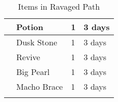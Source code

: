 \begin{longtable}{|| l l l l ||}%
\hline%
&Potion&1&3 days\\%
\hline%
&Dusk Stone&1&3 days\\%
\hline%
&Revive&1&3 days\\%
\hline%
&Big Pearl&1&3 days\\%
\hline%
&Macho Brace&1&3 days\\%
\hline%
\endhead%
\hline%
\caption{Items in Ravaged Path}%
\label{tab:RavagedPathItems}%
\end{longtable}
